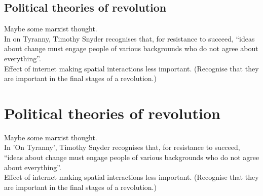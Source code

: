 \subsection{Political theories of revolution}
Maybe some marxist thought.\\
In on Tyranny, Timothy Snyder recognises that, for resistance to succeed, “ideas about change must engage people of various backgrounds who do not agree about everything”.\\
Effect of internet making spatial interactions less important. (Recognise that they are important in the final stages of a revolution.)

\section*{Political theories of revolution}
Maybe some marxist thought.\\
In 'On Tyranny', Timothy Snyder recognises that, for resistance to succeed, “ideas about change must engage people of various backgrounds who do not agree about everything”.\\
Effect of internet making spatial interactions less important. (Recognise that they are important in the final stages of a revolution.)

